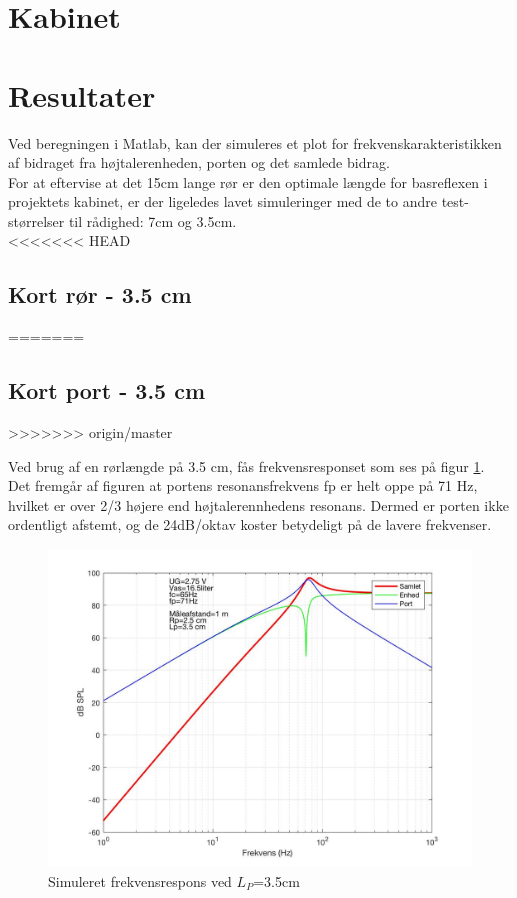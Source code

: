 \section{Kabinet}


\section{Resultater}

Ved beregningen i Matlab, kan der simuleres et plot for frekvenskarakteristikken af bidraget fra højtalerenheden, porten og det samlede bidrag. \\

For at eftervise at det 15cm lange rør er den optimale længde for basreflexen i projektets kabinet, er der ligeledes lavet simuleringer med de to andre test-størrelser til rådighed: 7cm og 3.5cm.\\

<<<<<<< HEAD
\subsection{Kort rør - 3.5 cm}
=======
\subsection{Kort port - 3.5 cm}
>>>>>>> origin/master

Ved brug af en rørlængde på 3.5 cm, fås frekvensresponset som ses på figur \ref{fig:sim_kort}. \\
Det fremgår af figuren at portens resonansfrekvens fp er helt oppe på 71 Hz, hvilket er over 2/3 højere end højtalerennhedens resonans. Dermed er porten ikke ordentligt afstemt, og de 24dB/oktav koster betydeligt på de lavere frekvenser. 

\begin{figure}[h!]
	\centering
	\includegraphics[width=.8\textwidth]{Pics/sim_kort}
	\caption{Simuleret frekvensrespons ved $L_P$=3.5cm } 
	\label{fig:sim_kort}
\end{figure}

